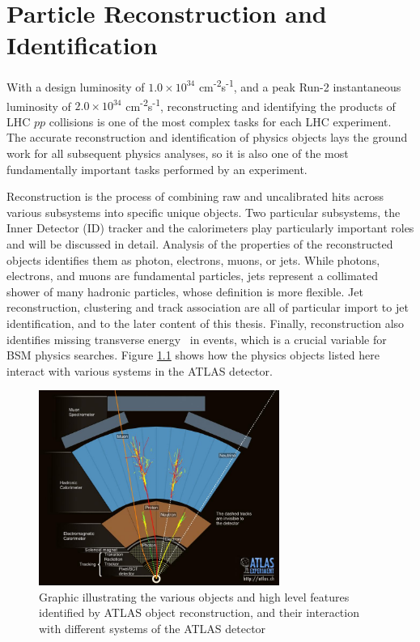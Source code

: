 \chapter{Particle Reconstruction and Identification}
\label{ch:part_reco}

With a design luminosity of $1.0 \times 10^{34}$ cm\textsuperscript{-2}s\textsuperscript{-1}, and a peak Run-2 instantaneous luminosity of $2.0 \times 10^{34}$ cm\textsuperscript{-2}s\textsuperscript{-1}, reconstructing and identifying the products of LHC $pp$ collisions is one of the most complex tasks for each LHC experiment. The accurate reconstruction and identification of physics objects lays the ground work for all subsequent physics analyses, so it is also one of the most fundamentally important tasks performed by an experiment. \par

Reconstruction is the process of combining raw and uncalibrated hits across various subsystems into specific unique objects. Two particular subsystems, the Inner Detector (ID) tracker and the calorimeters play particularly important roles and will be discussed in detail. Analysis of the properties of the reconstructed objects identifies them as photon, electrons, muons, or jets. While photons, electrons, and muons are fundamental particles, jets represent a collimated shower of many hadronic particles, whose definition is more flexible. Jet reconstruction, clustering and track association are all of particular import to jet identification, and to the later content of this thesis. Finally, reconstruction also identifies missing transverse energy \met~in events, which is a crucial variable for BSM physics searches. Figure \ref{fig:detector_objects} shows how the physics objects listed here interact with various systems in the ATLAS detector. 

\begin{figure}
        \centering
	\includegraphics[width=0.7\textwidth]{figures/ch5/detector_objects}
	\caption{Graphic illustrating the various objects and high level features identified by ATLAS object reconstruction, and their interaction with different systems of the ATLAS detector \cite{detector_events}}
	\label{fig:detector_objects}
\end{figure}


